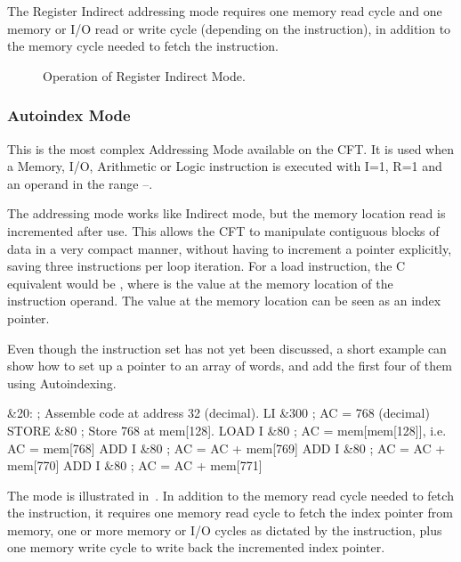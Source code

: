 The Register Indirect addressing mode requires one memory read cycle and one
memory or I/O read or write cycle (depending on the instruction), in addition
to the memory cycle needed to fetch the instruction.

\begin{figure}[htb]
 \centering
\caption[Register Indirect Mode]{\label{fig:register-indirect-mode} Operation
  of Register Indirect Mode.}
\end{figure}


\subsubsection{Autoindex Mode}
\label{sec:autoindex-mode}

This is the most complex \gls{Addressing Mode} available on the
CFT. It is used when a Memory, I/O, Arithmetic or Logic instruction is
executed with I=1, R=1 and an operand in the range
–.

The addressing mode works like Indirect mode, but the memory location read is
incremented after use. This allows the CFT to manipulate contiguous blocks of
data in a very compact manner, without having to increment a pointer
explicitly, saving three instructions per loop iteration. For a load
instruction, the C equivalent would be , where
 is the value at the memory location of the instruction operand. The
value at the memory location can be seen as an index pointer.

Even though the instruction set has not yet been discussed, a short example can
show how to set up a pointer to an array of words, and add the first four of
them using Autoindexing.

\begin{cftasmcode}
&20:                 ; Assemble code at address 32 (decimal).
        LI &300      ; AC = 768 (decimal)
        STORE &80    ; Store 768 at mem[128].
        LOAD I &80   ; AC = mem[mem[128]], i.e. AC = mem[768]
        ADD I &80    ; AC = AC + mem[769]
        ADD I &80    ; AC = AC + mem[770]
        ADD I &80    ; AC = AC + mem[771]
\end{cftasmcode}

The mode is illustrated in~. In addition to the memory
read cycle needed to fetch the instruction, it requires one memory read cycle
to fetch the index pointer from memory, one or more memory or I/O cycles as
dictated by the instruction, plus one memory write cycle to write back the
incremented index pointer.

